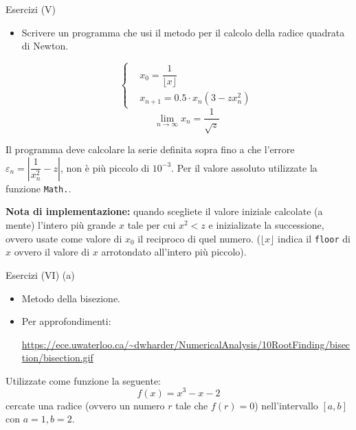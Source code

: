 \begin{frame}{Esercizi (V)}
  \begin{itemize}
    \item Scrivere un programma che usi il metodo per il calcolo della radice quadrata di Newton.
    
    \begin{equation*}
      \left\{\begin{aligned}
	  & x_0 = \dfrac{1}{\lfloor x \rfloor} \\
	  & x_{n +1} = 0.5 \cdot {x_n} (3  - zx^2_n)
      \end{aligned}\right.
    \end{equation*}
    \begin{equation*}
     \lim_{n \to \infty} x_{n} = \dfrac{1}{\sqrt{z}}
    \end{equation*}
  \end{itemize}
  
  Il programma deve calcolare la serie definita sopra fino a che l'errore
  $\varepsilon_{n} = \left|\dfrac{1}{x^{2}_{n}} - z\right|$,
  non è più piccolo di $10^{-3}$. Per il valore assoluto utilizzate la funzione \texttt{Math.}.

  \begin{scriptsize}
    \textbf{Nota di implementazione:} quando scegliete il valore iniziale calcolate (a mente) l'intero più grande $x$
    tale per cui $x^2 < z$ e inizializate la successione, ovvero usate come valore di $x_0$ il reciproco di quel numero.
    (${\lfloor x \rfloor}$ indica il \texttt{floor} di $x$ ovvero il valore di $x$ arrotondato all'intero più piccolo).  
  \end{scriptsize}

  
\end{frame}

\begin{frame}{Esercizi (VI) (a)}
  \begin{itemize}
    \item Metodo della bisezione.
    \item Per approfondimenti:\newline
    \begin{scriptsize}
      \url{https://ece.uwaterloo.ca/~dwharder/NumericalAnalysis/10RootFinding/bisection/bisection.gif}
    \end{scriptsize}
  \end{itemize}

  Utilizzate come funzione la seguente:
  \begin{equation}
    f(x) = x^3 - x - 2
  \end{equation}
  cercate una radice (ovvero un numero $r$ tale che $f(r) = 0$) nell'intervallo $[a, b]$ con $a=1, b=2$.

\end{frame}

